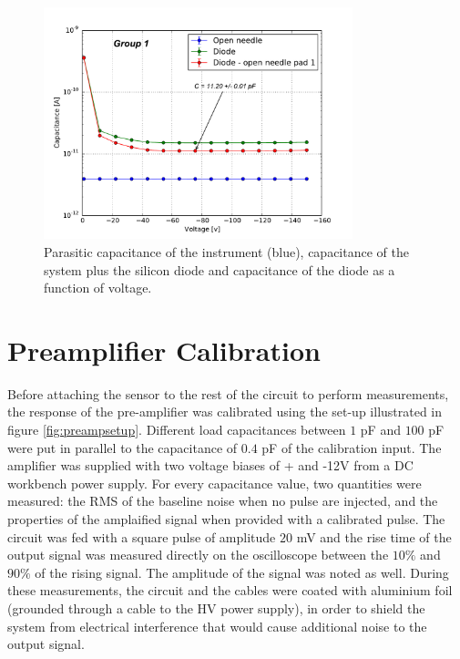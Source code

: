 \documentclass[12pt]{article}
\begin{document}
\begin{figure}[htb]
  \centering
  \includegraphics[width=0.8\textwidth]{./graphics/V_vs_C}
  \caption{Parasitic capacitance of the instrument (blue), capacitance of the system plus the silicon diode and capacitance of the diode as a function of voltage.}
  \label{fig:VC_curve_single}
\end{figure}



\section{Preamplifier Calibration}

Before attaching the sensor to the rest of the circuit to perform measurements, the response of the pre-amplifier was calibrated using the set-up illustrated in figure \ref{fig:preampsetup}. Different load capacitances between $1$ pF and $100$ pF were put in parallel to the capacitance of $0.4$ pF of the calibration input. The amplifier was supplied with two voltage biases of + and -12V from a DC workbench power supply. For every capacitance value, two quantities were measured: the RMS of the baseline noise when no pulse are injected, and the properties of the amplaified signal when provided with a calibrated pulse.  The circuit was fed with a square pulse of amplitude $20$ mV and the rise time of the output signal was measured directly on the oscilloscope between the $10\%$ and $90\%$ of the rising signal. The amplitude of the signal was noted as well. During these measurements, the circuit and the cables were coated with aluminium foil (grounded through a cable to the HV power supply), in order to shield the system from electrical interference that would cause additional noise to the output signal.
\end{document}
